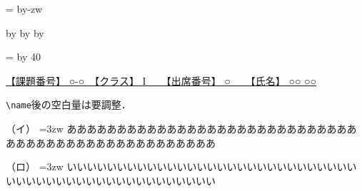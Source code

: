 \documentclass[uplatex]{jsarticle}
\makeatletter
\def\mojiparline#1{
\newcounter{mpl}
\setcounter{mpl}{#1}
\@tempdima=\linewidth
\advance\@tempdima by-\value{mpl}zw
\addtocounter{mpl}{-1}
\divide\@tempdima by \value{mpl}
\advance\kanjiskip by\@tempdima
\advance\parindent by\@tempdima
}
\def\linesparpage#1{
\baselineskip=\textheight
\divide\baselineskip by #1
}
\newcommand{\name}{○○ ○○}
\newcommand{\num}{○}
\makeatother
\begin{document}
\mojiparline{40}
\linesparpage{40}
\pagestyle{empty}
\begin{flushleft}
\textsf{
\underline{
【課題番号】 ○-○　【クラス】 I　　【出席番号】 \num　　【氏名】 \name\hspace{6.5em}
}
}
\end{flushleft}

\verb|\name|後の空白量は要調整．

\noindent
（イ）
\hangindent=3zw
\hspace{0zw}
ああああああああああああああああああああああああああああああああああああああああああああああああああ

\noindent
（ロ）
\hangindent=3zw
\hspace{0zw}
いいいいいいいいいいいいいいいいいいいいいいいいいいいいいいいいいいいいいいいいいいいいいいいいいい
\end{document}
